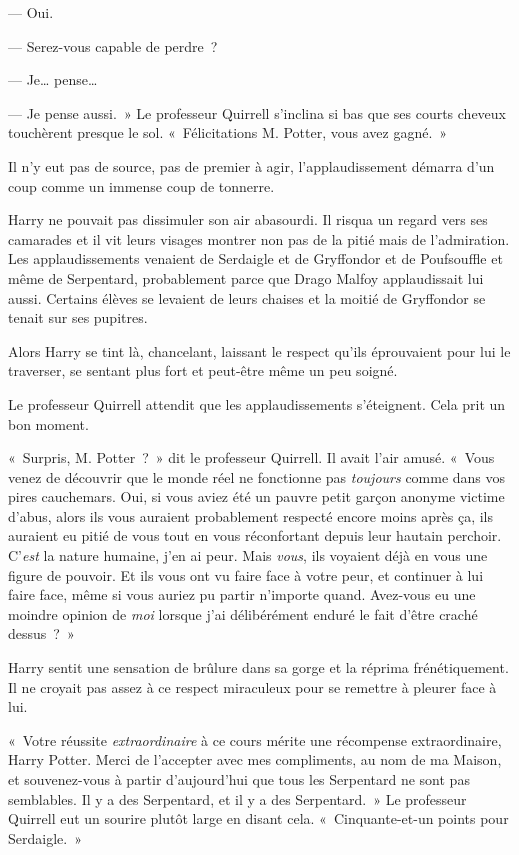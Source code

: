 --- Oui.

--- Serez-vous capable de perdre~?

--- Je… pense…

--- Je pense aussi.~»
Le professeur Quirrell s'inclina si bas que ses courts cheveux touchèrent presque le sol.
«~Félicitations M. Potter, vous avez gagné.~»

Il n'y eut pas de source, pas de premier à agir, l'applaudissement démarra d'un coup comme un immense coup de tonnerre.

Harry ne pouvait pas dissimuler son air abasourdi.
Il risqua un regard vers ses camarades et il vit leurs visages montrer non pas de la pitié mais de l'admiration.
Les applaudissements venaient de Serdaigle et de Gryffondor et de Poufsouffle et même de Serpentard, probablement parce que Drago Malfoy applaudissait lui aussi.
Certains élèves se levaient de leurs chaises et la moitié de Gryffondor se tenait sur ses pupitres.

Alors Harry se tint là, chancelant, laissant le respect qu'ils éprouvaient pour lui le traverser, se sentant plus fort et peut-être même un peu soigné.

Le professeur Quirrell attendit que les applaudissements s'éteignent.
Cela prit un bon moment.

«~Surpris, M. Potter~?~»
dit le professeur Quirrell.
Il avait l'air amusé.
«~Vous venez de découvrir que le monde réel ne fonctionne pas \emph{toujours} comme dans vos pires cauchemars.
Oui, si vous aviez été un pauvre petit garçon anonyme victime d'abus, alors ils vous auraient probablement respecté encore moins après ça, ils auraient eu pitié de vous tout en vous réconfortant depuis leur hautain perchoir.
C'\emph{est} la nature humaine, j'en ai peur.
Mais \emph{vous}, ils voyaient déjà en vous une figure de pouvoir.
Et ils vous ont vu faire face à votre peur, et continuer à lui faire face, même si vous auriez pu partir n'importe quand.
Avez-vous eu une moindre opinion de \emph{moi} lorsque j'ai délibérément enduré le fait d'être craché dessus~?~»

Harry sentit une sensation de brûlure dans sa gorge et la réprima frénétiquement.
Il ne croyait pas assez à ce respect miraculeux pour se remettre à pleurer face à lui.

«~Votre réussite \emph{extraordinaire} à ce cours mérite une récompense extraordinaire, Harry Potter.
Merci de l'accepter avec mes compliments, au nom de ma Maison, et souvenez-vous à partir d'aujourd'hui que tous les Serpentard ne sont pas semblables.
Il y a des Serpentard, et il y a des Serpentard.~»
Le professeur Quirrell eut un sourire plutôt large en disant cela.
«~Cinquante-et-un points pour Serdaigle.~»

